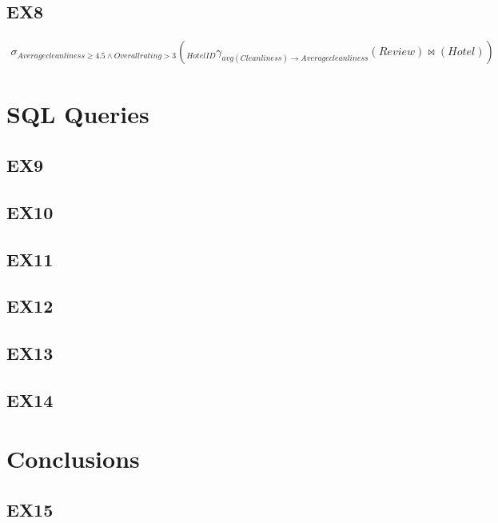 \documentclass{article}
\begin{document}
	\subsection{EX8}
	\begin{eqnarray}
	\sigma _{Average cleanliness \geq 4.5 \wedge Overall rating > 3}(_{Hotel ID} \gamma _{avg(Cleanliness) \rightarrow Average cleanliness}(Review) \bowtie (Hotel))
	\end{eqnarray}
	
	\section{SQL Queries}
	
	\subsection{EX9}
	
	\subsection{EX10}
	
	\subsection{EX11}
		
	\subsection{EX12}
	
	\subsection{EX13}
	
	\subsection{EX14}
	
	\section{Conclusions}
	
	\subsection{EX15}
\end{document}
